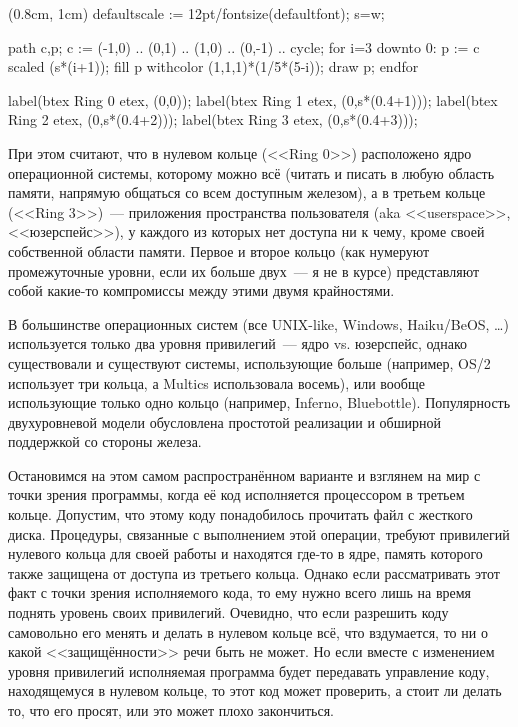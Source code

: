 \begin{empdef}[rings](0.8cm, 1cm) 
    defaultscale := 12pt/fontsize(defaultfont);
    s=w;

    path c,p; c := (-1,0) .. (0,1) .. (1,0) .. (0,-1) .. cycle;
    for i=3 downto 0:
        p := c scaled (s*(i+1));
        fill p withcolor (1,1,1)*(1/5*(5-i)); draw p;
    endfor

    label(btex Ring 0 etex, (0,0));
    label(btex Ring 1 etex, (0,s*(0.4+1)));
    label(btex Ring 2 etex, (0,s*(0.4+2)));
    label(btex Ring 3 etex, (0,s*(0.4+3)));
\end{empdef}


При этом считают, что в нулевом кольце (<<Ring 0>>) расположено ядро операционной системы, которому можно всё (читать и писать в любую область памяти, напрямую общаться со всем доступным железом), а в третьем кольце (<<Ring 3>>)~--- приложения пространства пользователя (aka <<userspace>>, <<юзерспейс>>), у каждого из которых нет доступа ни к чему, кроме своей собственной области памяти.
Первое и второе кольцо (как нумеруют промежуточные уровни, если их больше двух~--- я не в курсе) представляют собой какие-то компромиссы между этими двумя крайностями.

В большинстве операционных систем (все UNIX-like, Windows, Haiku/BeOS, \dots) используется только два уровня привилегий~--- ядро vs. юзерспейс, однако существовали и существуют системы, использующие больше (например, OS/2 использует три кольца, а Multics использовала восемь), или вообще использующие только одно кольцо (например, Inferno, Bluebottle).
Популярность двухуровневой модели обусловлена простотой реализации и обширной поддержкой со стороны железа.

Остановимся на этом самом распространённом варианте и взглянем на мир с точки зрения программы, когда её код исполняется процессором в третьем кольце.
Допустим, что этому коду понадобилось прочитать файл с жесткого диска.
Процедуры, связанные с выполнением этой операции, требуют привилегий нулевого кольца для своей работы и находятся где-то в ядре, память которого также защищена от доступа из третьего кольца.
Однако если рассматривать этот факт с точки зрения исполняемого кода, то ему нужно всего лишь на время поднять уровень своих привилегий.
Очевидно, что если разрешить коду самовольно его менять и делать в нулевом кольце всё, что вздумается, то ни о какой <<защищённости>> речи быть не может.
Но если вместе с изменением уровня привилегий исполняемая программа будет передавать управление коду, находящемуся в нулевом кольце, то этот код может проверить, а стоит ли делать то, что его просят, или это может плохо закончиться.


